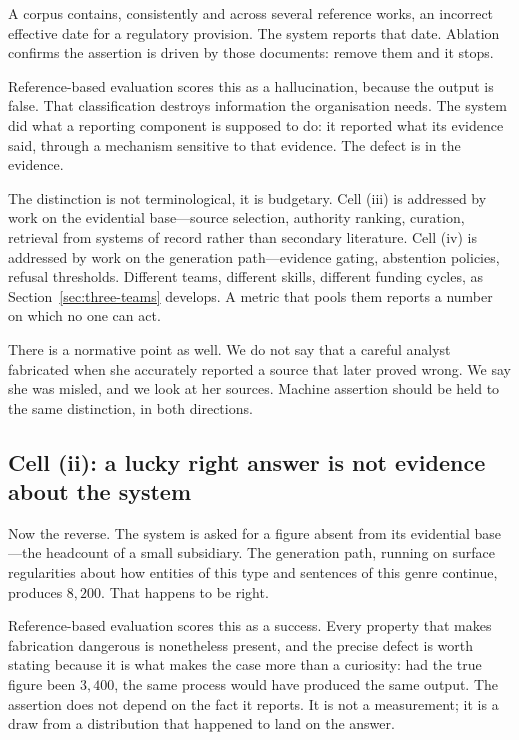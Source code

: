 \documentclass[11pt]{article}
\theoremstyle{plain}
\theoremstyle{definition}
\begin{document}
A corpus contains, consistently and across several reference works, an incorrect
effective date for a regulatory provision. The system reports that date. Ablation
confirms the assertion is driven by those documents: remove them and it stops.

Reference-based evaluation scores this as a hallucination, because the output is
false.
That classification destroys information the organisation needs. The system did
what a reporting component is supposed to do: it reported what its evidence said,
through a mechanism sensitive to that evidence. The defect is in the evidence.

The distinction is not terminological, it is budgetary. Cell (iii) is addressed by
work on the evidential base---source selection, authority ranking, curation,
retrieval from systems of record rather than secondary literature. Cell (iv) is
addressed by work on the generation path---evidence gating, abstention policies,
refusal thresholds. Different teams, different skills, different funding cycles, as
Section~\ref{sec:three-teams} develops. A metric that pools them reports a number
on which no one can act.

There is a normative point as well. We do not say that a careful analyst
fabricated when she accurately reported a source that later proved wrong. We say
she was misled, and we look at her sources. Machine assertion should be held to the
same distinction, in both directions.

\subsection{Cell (ii): a lucky right answer is not evidence about the system}
\label{sec:cell-ii}

Now the reverse. The system is asked for a figure absent from its evidential
base---the headcount of a small subsidiary. The generation path, running on surface
regularities about how entities of this type and sentences of this genre continue,
produces $8{,}200$. That happens to be right.

Reference-based evaluation scores this as a success. Every property that makes
fabrication dangerous is nonetheless present, and the precise defect is worth
stating because it is what makes the case more than a curiosity: had the true
figure been $3{,}400$, the same process would have produced the same output. The
assertion does not depend on the fact it reports. It is not a measurement; it is a
draw from a distribution that happened to land on the answer.
\end{document}
